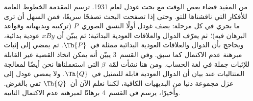 \documentclass[../../../include/open-logic-section]{subfiles}
\begin{document}


من المفيد قضاء بعض الوقت مع بحث غودل لعام 1931. ترسم المقدمة الخطوط
العامة للأفكار التي ناقشناها للتو. وحتى إذا تصفحت البحث تصفحًا سريعًا،
فمن السهل أن ترى ما يجري في كل مرحلة: يصف غودل أولًا النسق الصوري~$P$
(تركيبه وبديهياته وقواعد البرهان فيه)؛ ثم يعرّف الدوال والعلاقات
العودية البدائية؛ ثم يبيّن أن $x B y$ عودية بدائية، ويحاجج بأن الدوال
والعلاقات العودية البدائية ممثلة في~$\Th{P}$. ثم يمضي إلى إثبات مبرهنة
عدم الاكتمال كما سبق. وفي القسم~3 يبيّن أنه يمكن اتخاذ القضية غير
القابلة للإثبات جملة في لغة الحساب. ومن هنا نشأت لمّة~$\beta$ التي
استعملناها نحن أيضًا لمعالجة المتتاليات عند بيان أن الدوال العودية
قابلة للتمثيل في~$\Th{Q}$. ولا يمضي غودل إلى عزل مجموعة دنيا من
البديهيات الكافية، لكننا نعلم الآن أن~$\Th{Q}$ تفي بالغرض. وأخيرًا،
يرسم في القسم~4 برهانًا لمبرهنة عدم الاكتمال الثانية.
\end{document}
